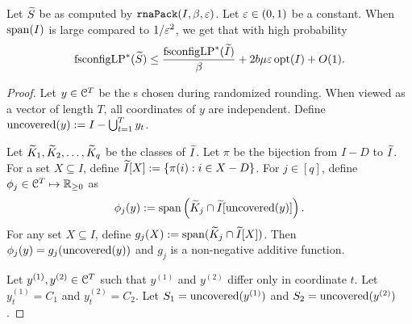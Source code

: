 \begin{lemma}
\label{thm:fclp-conc}
Let $\widetilde{S}$ be as computed by $\operatorname{\mathtt{rnaPack}}(I, \beta, \varepsilon)$. Let $\varepsilon \in (0, 1)$ be a constant.
When $\operatorname{span}(I)$ is large compared to $1/\varepsilon^2$, we get that with high probability
\[ \operatorname{fsconfigLP}^*(\widetilde{S}) \le \frac{\operatorname{fsconfigLP}^*(\widetilde{I})}{\beta} + 2b\mu\varepsilon\operatorname{opt}(I) + O(1). \]
\end{lemma}
\begin{proof}
Let $y \in \mathcal{C}^T$ be the \config{}s chosen during randomized rounding.
When viewed as a vector of length $T$, all coordinates of $y$ are independent.
Define $\operatorname{uncovered}(y) := I - \bigcup_{t=1}^T y_t$.

Let $\widetilde{K}_1, \widetilde{K}_2, \ldots, \widetilde{K}_q$ be the classes of $\widetilde{I}$.
Let $\pi$ be the bijection from $I-D$ to $\widetilde{I}$.
For a set $X \subseteq I$, define $\widetilde{I}[X] := \{\pi(i): i \in X-D\}$.
For $j \in [q]$, define $\phi_j \in \mathcal{C}^T \mapsto \mathbb{R}_{\ge 0}$ as
\[ \phi_j(y) := \operatorname{span}\left(\widetilde{K}_j \cap \widetilde{I}[\operatorname{uncovered}(y)]\right). \]
For any set $X \subseteq I$, define $g_j(X) := \operatorname{span}(\widetilde{K}_j \cap \widetilde{I}[X])$.
Then $\phi_j(y) = g_j(\operatorname{uncovered}(y))$ and $g_j$ is a non-negative additive function.

Let $y^{(1)}, y^{(2)} \in \mathcal{C}^T$ such that
$y^{(1)}$ and $y^{(2)}$ differ only in coordinate $t$.
Let $y^{(1)}_t = C_1$ and $y^{(2)}_t = C_2$.
Let $S_1 = \operatorname{uncovered}(y^{(1)})$ and $S_2 = \operatorname{uncovered}(y^{(2)})$.


\end{proof}
